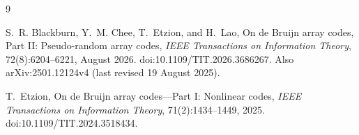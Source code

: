 \documentclass[11pt]{article}
\begin{document}
\begin{thebibliography}{9}

S.~R. Blackburn, Y.~M. Chee, T.~Etzion, and H.~Lao,
\newblock On de Bruijn array codes, Part II: Pseudo-random array codes,
\newblock \emph{IEEE Transactions on Information Theory},
72(8):6204--6221, August 2026.
\newblock doi:10.1109/TIT.2026.3686267.
\newblock Also arXiv:2501.12124v4 (last revised 19 August 2025).

T.~Etzion,
\newblock On de Bruijn array codes---Part I: Nonlinear codes,
\newblock \emph{IEEE Transactions on Information Theory},
71(2):1434--1449, 2025.
\newblock doi:10.1109/TIT.2024.3518434.

\end{thebibliography}
\end{document}
